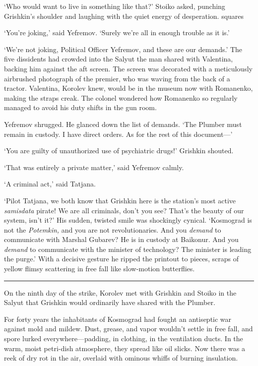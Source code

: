 `Who would want to live in something like that?' Stoiko asked, punching Grishkin's shoulder and laughing with the quiet energy of desperation.
squares

`You're joking,' said Yefremov. `Surely we're all in enough trouble as it is.'

`We're not joking, Political Officer Yefremov, and these are our demands.' The five dissidents had crowded into the Salyut the man shared with Valentina, backing him against the aft screen. The screen was decorated with a meticulously airbrushed photograph of the premier, who was waving from the back of a tractor. Valentina, Korolev knew, would be in the museum now with Romanenko, making the straps creak. The colonel wondered how Romanenko so regularly managed to avoid his duty shifts in the gun room.

Yefremov shrugged. He glanced down the list of demands. `The Plumber must remain in custody. I have direct orders. As for the rest of this document---'

`You are guilty of unauthorized use of psychiatric drugs!' Grishkin shouted.

`That was entirely a private matter,' said Yefremov calmly.

`A criminal act,' said Tatjana.

`Pilot Tatjana, we both know that Grishkin here is the station's most active \textit{samisdata} pirate! We are all criminals, don't you see? That's the beauty of our system, isn't it?' His sudden, twisted smile was shockingly cynical. `Kosmograd is not the \textit{Potemkin,} and you are not revolutionaries. And you \textit{demand} to communicate with Marshal Gubarev? He is in custody at Baikonur. And you \textit{demand} to communicate with the minister of technology? The minister is leading the purge.' With a decisive gesture he ripped the printout to pieces, scraps of yellow flimsy scattering in free fall like slow-motion butterflies.

\fancybreak{* * *}

On the ninth day of the strike, Korolev met with Grishkin and Stoiko in the Salyut that Grishkin would ordinarily have shared with the Plumber.

For forty years the inhabitants of Kosmograd had fought an antiseptic war against mold and mildew. Dust, grease, and vapor wouldn't settle in free fall, and spore lurked everywhere---padding, in clothing, in the ventilation ducts. In the warm, moist petri-dish atmosphere, they spread like oil slicks. Now there was a reek of dry rot in the air, overlaid with ominous whiffs of burning insulation.

